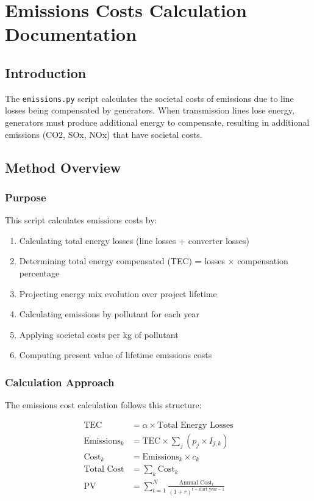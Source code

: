 \documentclass[ctcc_full_documentation.tex]{subfiles}
\begin{document}
\chapter{Emissions Costs Calculation Documentation}

\section{Introduction}

The \texttt{emissions.py} script calculates the societal costs of emissions due to line losses being compensated by generators. When transmission lines lose energy, generators must produce additional energy to compensate, resulting in additional emissions (CO2, SOx, NOx) that have societal costs.

\section{Method Overview}

\subsection{Purpose}

This script calculates emissions costs by:
\begin{enumerate}
    \item Calculating total energy losses (line losses + converter losses)
    \item Determining total energy compensated (TEC) = losses × compensation percentage
    \item Projecting energy mix evolution over project lifetime
    \item Calculating emissions by pollutant for each year
    \item Applying societal costs per kg of pollutant
    \item Computing present value of lifetime emissions costs
\end{enumerate}

\subsection{Calculation Approach}

The emissions cost calculation follows this structure:

\begin{align}
\text{TEC} &= \alpha \times \text{Total Energy Losses} \\
\text{Emissions}_k &= \text{TEC} \times \sum_j (p_j \times I_{j,k}) \\
\text{Cost}_k &= \text{Emissions}_k \times c_k \\
\text{Total Cost} &= \sum_k \text{Cost}_k \\
\text{PV} &= \sum_{t=1}^{N} \frac{\text{Annual Cost}_t}{(1 + r)^{t + \text{start\_year} - 1}}
\end{align}
\end{document}

